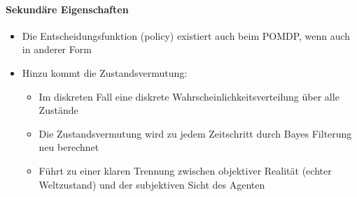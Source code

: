 \paragraph{Sekund\"are Eigenschaften}
\begin{itemize}
	\item Die Entscheidungsfunktion (policy) existiert auch beim POMDP, wenn auch in anderer Form
	\item Hinzu kommt die Zustandsvermutung:
	\begin{itemize}
		\item Im diskreten Fall eine diskrete Wahrscheinlichkeitsverteilung \"uber alle Zust\"ande
		\item Die Zustandsvermutung wird zu jedem Zeitschritt durch Bayes Filterung neu berechnet
		\item F\"uhrt zu einer klaren Trennung zwischen objektiver Realit\"at (echter Weltzustand) und der subjektiven Sicht des Agenten
	\end{itemize}
\end{itemize}

